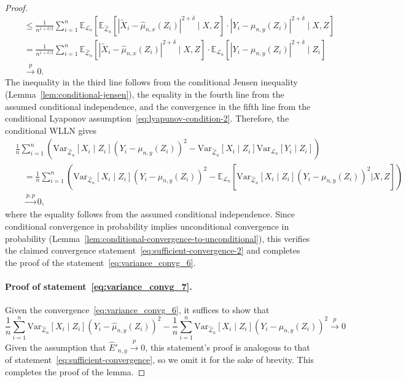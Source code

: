 \documentclass[aos]{imsart}
\theoremstyle{plain}
\theoremstyle{remark}
\newcommand{\E}{\mathbb E}								%
\newcommand{\V}{\mathrm{Var}}							%
\newcommand{\convp}{\overset p \rightarrow}             %
\newcommand{\srx}{X}									%
\newcommand{\srz}{Z}									%
\newcommand{\srxk}{\widetilde X}						%
\newcommand{\sry}{Y}									%
\newcommand{\law}{\mathcal L}							%
\newcommand{\lawhat}{\widehat{\mathcal L}}				%
\newcommand{\convpp}{\overset {p,p} \longrightarrow}    %
\begin{document}
\begin{proof}
\begin{align*}
		&\quad\leq \frac{1}{n^{1+\delta/2}} \sum_{i = 1}^n \E_{\law_n}\left[\E_{\lawhat_n}[|\srxk_i-\widehat{\mu}_{n,x}(Z_i)|^{2+\delta} \mid \srx, \srz] \cdot |\sry_i-\mu_{n,y}(Z_i)|^{2+\delta} \mid \srx,\srz\right]\\
		&\quad= \frac{1}{n^{1+\delta/2}} \sum_{i = 1}^n \E_{\lawhat_n}[|\srxk_i-\widehat\mu_{n,x}(Z_i)|^{2+\delta}\mid \srx, \srz] \cdot \E_{\law_n}\left[|\sry_i-\mu_{n,y}(Z_i)|^{2+\delta} \mid Z_i\right]\\
		&\quad\convp 0. 
	\end{align*}
	The inequality in the third line follows from the conditional Jensen inequality (Lemma~\ref{lem:conditional-jensen}), the equality in the fourth line from the assumed conditional independence, and the convergence in the fifth line from the conditional Lyaponov assumption~\eqref{eq:lyapunov-condition-2}. Therefore, the conditional WLLN gives
	\begin{equation*}
	\begin{split}
	&\frac{1}{n} \sum_{i=1}^n \left(\V_{\lawhat_n}[\srx_i\mid \srz_i](\sry_i-\mu_{n,y}(\srz_i))^2- \V_{\lawhat_n}[\srx_i\mid \srz_i]\V_{\law_n}[\sry_i \mid \srz_i]\right) \\
	&\quad = \frac{1}{n} \sum_{i=1}^n \left(\V_{\lawhat_n}[\srx_i\mid \srz_i](\sry_i-\mu_{n,y}(\srz_i))^2- \E_{\law_n}[\V_{\lawhat_n}[\srx_i\mid \srz_i](\sry_i-\mu_{n,y}(\srz_i))^2 | \srx, \srz]\right) \\
	&\quad \convpp 0,
	\end{split}
	\end{equation*}
	where the equality follows from the assumed conditional independence. Since conditional convergence in probability implies unconditional convergence in probability (Lemma~\ref{lem:conditional-convergence-to-unconditional}), this verifies the claimed convergence statement~\eqref{eq:sufficient-convergence-2} and completes the proof of the statement~\eqref{eq:variance_convg_6}.

\paragraph*{Proof of statement~\eqref{eq:variance_convg_7}.} 

Given the convergence~\eqref{eq:variance_convg_6}, it suffices to show that
\begin{equation}
\frac{1}{n}\sum_{i=1}^n \V_{\lawhat_n}[\srx_i\mid \srz_i](\sry_i-\widehat \mu_{n,y}(\srz_i))^2-\frac{1}{n}\sum_{i=1}^n \V_{\lawhat_n}[\srx_i\mid \srz_i](\sry_i-\mu_{n,y}(\srz_i))^2
\convp 0
\end{equation}
Given the assumption that $\widehat E'_{n,y} \convp 0$, this statement's proof is analogous to that of statement~\eqref{eq:sufficient-convergence}, so we omit it for the sake of brevity. This completes the proof of the lemma.
\end{proof}
\end{document}
